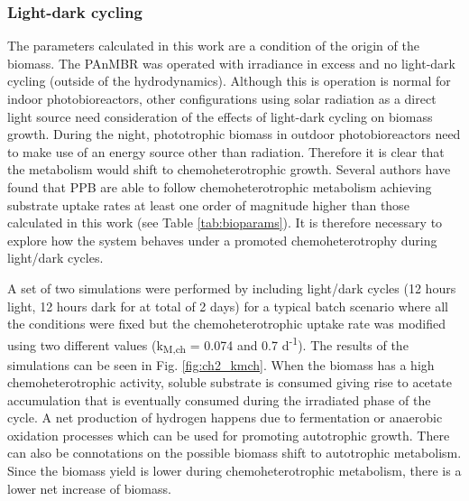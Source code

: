 \subsubsection{Light-dark cycling}
The parameters calculated in this work are a condition of the origin of the biomass. The PAnMBR was operated with irradiance in excess and no light-dark cycling (outside of the hydrodynamics). Although this is operation is normal for indoor photobioreactors, other configurations using solar radiation as a direct light source need consideration of the effects of light-dark cycling on biomass growth. During the night, phototrophic biomass in outdoor photobioreactors need to make use of an energy source other than radiation. Therefore it is clear that the metabolism would shift to chemoheterotrophic growth. Several authors have found that PPB are able to follow chemoheterotrophic metabolism achieving substrate uptake rates at least one order of magnitude higher than those calculated in this work (see Table \ref{tab:bioparams}). It is therefore necessary to explore how the system behaves under a promoted chemoheterotrophy during light/dark cycles.

A set of two simulations were performed by including light/dark cycles (12 hours light, 12 hours dark for at total of 2 days) for a typical batch scenario where all the conditions were fixed but the chemoheterotrophic uptake rate was modified using two different values (k\textsubscript{M,ch} = 0.074 and 0.7 d\textsuperscript{-1}). The results of the simulations can be seen in Fig. \ref{fig:ch2_kmch}.  When the biomass has a high chemoheterotrophic activity, soluble substrate is consumed giving rise to acetate accumulation that is eventually consumed during the irradiated phase of the cycle. A net production of hydrogen happens due to fermentation or anaerobic oxidation processes which can be used for promoting autotrophic growth. There can also be connotations on the possible biomass shift to autotrophic metabolism. Since the biomass yield is lower during chemoheterotrophic metabolism, there is a lower net increase of biomass. 

